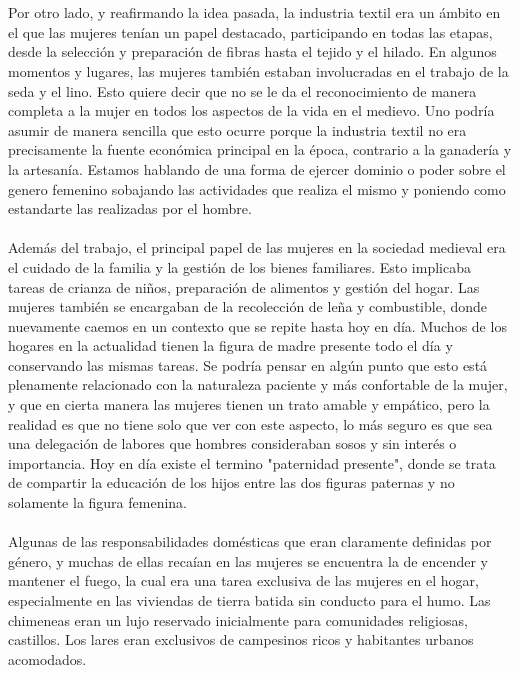\documentclass{report}
\begin{document}
\\\\
Por otro lado, y reafirmando la idea pasada, la industria textil era un ámbito en el que las mujeres tenían un papel destacado, participando en todas las etapas, desde la selección y preparación de fibras hasta el tejido y el hilado. En algunos momentos y lugares, las mujeres también estaban involucradas en el trabajo de la seda y el lino. Esto quiere decir que no se le da el reconocimiento de manera completa a la mujer en todos los aspectos de la vida en el medievo. Uno podría asumir de manera sencilla que esto ocurre porque la industria textil no era precisamente la fuente económica principal en la época, contrario a la ganadería y la artesanía. Estamos hablando de una forma de ejercer dominio o poder sobre el genero femenino sobajando las actividades que realiza el mismo y poniendo como estandarte las realizadas por el hombre. 
\\\\
Además del trabajo, el principal papel de las mujeres en la sociedad medieval era el cuidado de la familia y la gestión de los bienes familiares. Esto implicaba tareas de crianza de niños, preparación de alimentos y gestión del hogar. Las mujeres también se encargaban de la recolección de leña y combustible, donde nuevamente caemos en un contexto que se repite hasta hoy en día. Muchos de los hogares en la actualidad tienen la figura de madre presente todo el día y conservando las mismas tareas. Se podría pensar en algún punto que esto está plenamente relacionado con la naturaleza paciente y más confortable de la mujer, y que en cierta manera las mujeres tienen un trato amable y empático, pero la realidad es que no tiene solo que ver con este aspecto, lo más seguro es que sea una delegación de labores que hombres consideraban sosos y sin interés o importancia. Hoy en día existe el termino "paternidad presente", donde se trata de compartir la educación de los hijos entre las dos figuras paternas y no solamente la figura femenina. 
\\\\
Algunas de las responsabilidades domésticas que eran claramente definidas por género, y muchas de ellas recaían en las mujeres se encuentra la de encender y mantener el fuego, la cual era una tarea exclusiva de las mujeres en el hogar, especialmente en las viviendas de tierra batida sin conducto para el humo. 
Las chimeneas eran un lujo reservado inicialmente para comunidades religiosas, castillos. Los lares eran exclusivos de campesinos ricos y habitantes urbanos acomodados. 
\end{document}
